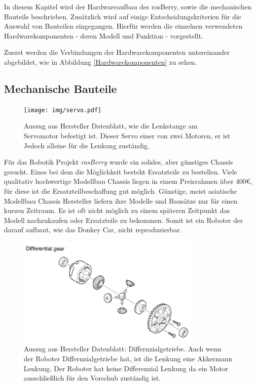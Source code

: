 \documentclass[conference]{IEEEtran}
\begin{document}
	In diesem Kapitel wird der Hardwareaufbau des rosBerry, sowie die 
	mechanischen Bauteile beschrieben. Zusätzlich wird auf einige 
	Entscheidungskriterien für die Auswahl von Bauteilen eingegangen. 
	Hierfür werden die einzelnen verwendeten Hardwarekomponenten - deren Modell und Funktion - vorgestellt. 
	
	Zuerst werden die Verbindungen der Hardwarekomponenten untereinander abgebildet, wie in Abbildung \ref{Hardwarekomponenten} zu sehen.
	\subsection{Mechanische Bauteile}
	
	\begin{figure}[h]
		\centering
		\texttt{[image: img/servo.pdf]}
		\caption{Auszug aus Hersteller Datenblatt, wie die Lenkstange am 
		Servomotor  befestigt ist. Dieser Servo einer von zwei Motoren, er  ist 
		Jedoch alleine für die Lenkung zuständig. }
		\label{Servomotor}
	\end{figure}
	Für das Robotik Projekt \textit{rosBerry} wurde ein solides, aber 
	günstiges Chassis gesucht. 
	Eines bei dem die Möglichkeit besteht Ersatzteile zu bestellen. 
	Viele qualitativ hochwertige Modellbau Chassis liegen in einem 
	Preisrahmen über 400€, für diese ist die Ersatzteilbeschaffung gut 
	möglich. Günstige, meist asiatische Modellbau Chassis Hersteller liefern 
	ihre Modelle und Bausätze nur für einen kurzen Zeitraum. Es ist oft nicht 
	möglich zu einem späteren Zeitpunkt das Modell nachzukaufen oder 
	Ersatzteile zu bekommen. Somit ist ein Roboter der darauf aufbaut, wie 
	das Donkey Car, nicht reproduzierbar. 
	\\
	\begin{figure} %
		\centering
		\includegraphics[width=9cm]{img/geer.png}
		\caption{Auszug aus Hersteller Datenblatt: Differnzialgetriebe. Auch 
		wenn der Roboter Differnzialgetriebe hat, ist die Lenkung eine 
		Akkermann Lenkung. Der Roboter hat keine Differenzial Lenkung da 
		ein Motor ausschließlich für den Vorschub zuständig ist. }
		\label{Getriebe}
	\end{figure}
\end{document}
